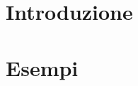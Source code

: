 \documentclass[a4paper, 11pt]{book}
\theoremstyle{plain}
\theoremstyle{definition}
\numberwithin{equation}{chapter}
\numberwithin{figure}{chapter}
\numberwithin{table}{chapter}
\begin{document}
\mainmatter




\chapter{Introduzione}




\chapter{Esempi}

\lipsum[2]


\end{document}
